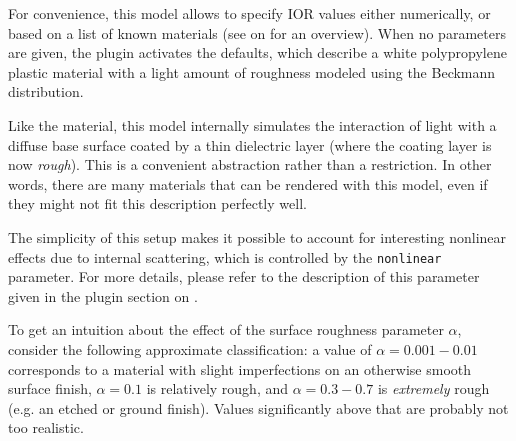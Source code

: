 For convenience, this model allows to specify IOR values either numerically,
or based on a list of known materials (see  on
 for an overview).
When no parameters are given, the plugin activates the defaults,
which describe a white polypropylene plastic material with a light amount
of roughness modeled using the Beckmann distribution.

Like the  material, this model internally simulates the
interaction of light with a diffuse base surface coated by a thin dielectric
layer (where the coating layer is now \emph{rough}). This is a convenient
abstraction rather than a restriction. In other words, there are many
materials that can be rendered with this model, even if they might not
fit this description perfectly well.

The simplicity of this setup makes it possible to account for interesting
nonlinear effects due to internal scattering, which is controlled by
the \texttt{nonlinear} parameter. For more details, please refer to the description
of this parameter given in the  plugin section
on .

To get an intuition about the effect of the surface roughness parameter
$\alpha$, consider the following approximate classification: a value of
$\alpha=0.001-0.01$ corresponds to a material with slight imperfections
on an otherwise smooth surface finish, $\alpha=0.1$ is relatively rough,
and $\alpha=0.3-0.7$ is \emph{extremely} rough (e.g. an etched or ground
finish). Values significantly above that are probably not too realistic.

